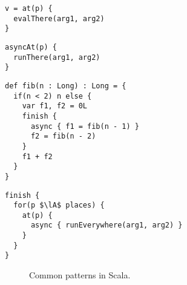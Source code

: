 \newsavebox\patternRemoteEval
\begin{lrbox}{\patternRemoteEval}
\begin{lstlisting}
v = at(p) {
  evalThere(arg1, arg2)
}
\end{lstlisting}
\end{lrbox}

\newsavebox\patternActiveMessage
\begin{lrbox}{\patternActiveMessage}
\begin{lstlisting}
asyncAt(p) {
  runThere(arg1, arg2)
}
\end{lstlisting}
\end{lrbox}

\newsavebox\patternRecursiveParallelDecomposition
\begin{lrbox}{\patternRecursiveParallelDecomposition}
\begin{lstlisting}
def fib(n : Long) : Long = {
  if(n < 2) n else {
    var f1, f2 = 0L
    finish {
      async { f1 = fib(n - 1) }
      f2 = fib(n - 2)
    }
    f1 + f2
  }
}
\end{lstlisting}
\end{lrbox}

\newsavebox\patternSPMD
\begin{lrbox}{\patternSPMD}
\begin{lstlisting}
finish {
  for(p $\lA$ places) {
    at(p) {
      async { runEverywhere(arg1, arg2) }
    }
  }
}
\end{lstlisting}
\end{lrbox}

\begin{figure*}
\centering
\subfloat{\usebox\patternRemoteEval}\qquad
\subfloat{\usebox\patternActiveMessage}\qquad
\subfloat{\usebox\patternRecursiveParallelDecomposition}\qquad
\subfloat{\usebox\patternSPMD}\qquad
\caption{Common \apgas patterns in Scala.\label{fig:apgas-patterns}}
\end{figure*}
